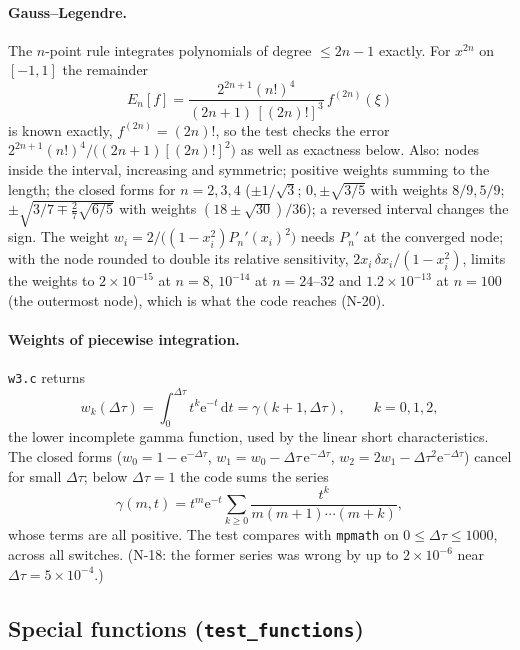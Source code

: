 \documentclass[11pt,a4paper]{article}
\newcommand{\code}[1]{\texttt{#1}}
\newcommand{\dd}{\mathrm{d}}
\newcommand{\e}{\mathrm{e}}
\begin{document}
\paragraph{Gauss--Legendre.} The $n$-point rule integrates polynomials
of degree $\le 2n-1$ exactly. For $x^{2n}$ on $[-1,1]$ the remainder
\begin{equation}
E_n[f] = \frac{2^{2n+1}(n!)^4}{(2n+1)\,[(2n)!]^3}\,f^{(2n)}(\xi)
\end{equation}
is known exactly, $f^{(2n)} = (2n)!$, so the test checks the error
$2^{2n+1}(n!)^4/\bigl((2n+1)[(2n)!]^2\bigr)$ as well as exactness below.
Also: nodes inside the interval, increasing and symmetric; positive
weights summing to the length; the closed forms for $n=2,3,4$
($\pm1/\sqrt3$; $0,\pm\sqrt{3/5}$ with weights $8/9, 5/9$;
$\pm\sqrt{3/7\mp\frac27\sqrt{6/5}}$ with weights
$(18\pm\sqrt{30})/36$); a reversed interval changes the sign.
The weight $w_i = 2/\bigl((1-x_i^2)P_n'(x_i)^2\bigr)$ needs $P_n'$ at
the converged node; with the node rounded to double its relative
sensitivity, $2x_i\,\delta x_i/(1-x_i^2)$, limits the weights to
$2\times10^{-15}$ at $n=8$, $10^{-14}$ at $n=24$--$32$ and
$1.2\times10^{-13}$ at $n=100$ (the outermost node), which is what the
code reaches (N-20).

\paragraph{Weights of piecewise integration.} \code{w3.c} returns
\begin{equation}
w_k(\Delta\tau) = \int_0^{\Delta\tau} t^k\e^{-t}\,\dd t = \gamma(k+1,\Delta\tau),\qquad k=0,1,2,
\end{equation}
the lower incomplete gamma function, used by the linear short
characteristics. The closed forms
($w_0 = 1-\e^{-\Delta\tau}$, $w_1 = w_0 - \Delta\tau\,\e^{-\Delta\tau}$,
$w_2 = 2w_1 - \Delta\tau^2\e^{-\Delta\tau}$) cancel for small
$\Delta\tau$; below $\Delta\tau = 1$ the code sums the series
\begin{equation}
\gamma(m,t) = t^m\e^{-t}\sum_{k\ge0}\frac{t^k}{m(m+1)\cdots(m+k)},
\end{equation}
whose terms are all positive. The test compares with \code{mpmath} on
$0\le\Delta\tau\le1000$, across all switches. (N-18: the former series
was wrong by up to $2\times10^{-6}$ near $\Delta\tau=5\times10^{-4}$.)

\subsection{Special functions (\code{test\_functions})}
\end{document}
